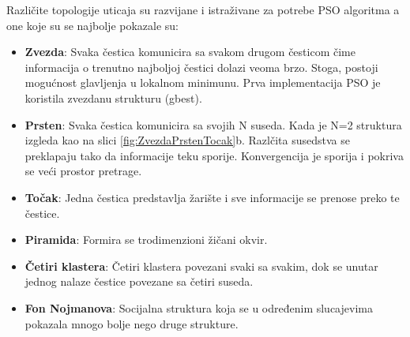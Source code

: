 \documentclass[a4paper]{article}
\begin{document}
Različite topologije uticaja su razvijane i istraživane za potrebe PSO algoritma a one koje su se najbolje pokazale su:
\begin{itemize}
    \item \textbf{Zvezda}: Svaka čestica komunicira sa svakom drugom česticom čime informacija o trenutno najboljoj čestici dolazi veoma brzo. Stoga, postoji mogućnost glavljenja u lokalnom minimunu. Prva implementacija PSO je koristila zvezdanu strukturu (gbest).
    \item \textbf{Prsten}: Svaka čestica komunicira sa svojih N suseda. Kada je N=2 struktura izgleda kao na slici \ref{fig:ZvezdaPrstenTocak}b. Razlčita susedstva se preklapaju tako da informacije teku sporije. Konvergencija je sporija i pokriva se veći prostor pretrage.
    \item \textbf{Točak}: Jedna čestica predstavlja žarište i sve informacije se prenose preko te čestice.
    \item \textbf{Piramida}: Formira se trodimenzioni žičani okvir.
    \item \textbf{Četiri klastera}: Četiri klastera povezani svaki sa svakim, dok se unutar jednog nalaze čestice povezane sa četiri suseda.
    \item \textbf{Fon Nojmanova}: Socijalna struktura koja se u određenim slucajevima pokazala mnogo bolje nego druge strukture.
\end{itemize}
\end{document}

